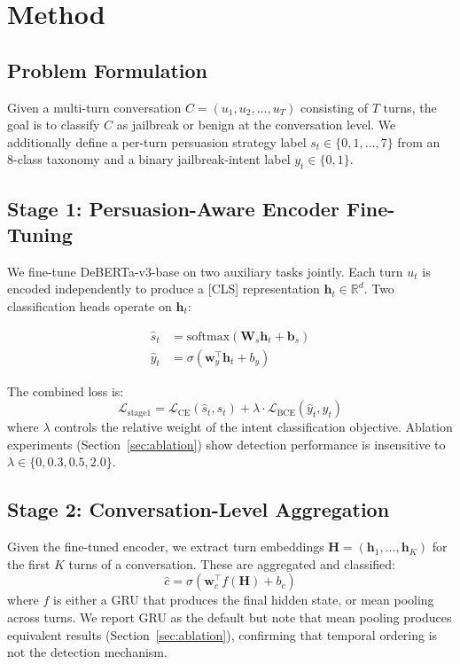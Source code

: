 \documentclass[11pt,a4paper]{article}
\begin{document}
\section{Method}

\subsection{Problem Formulation}
Given a multi-turn conversation $C = (u_1, u_2, \ldots, u_T)$ consisting of $T$ turns, the goal is to classify $C$ as jailbreak or benign at the conversation level.
We additionally define a per-turn persuasion strategy label $s_t \in \{0, 1, \ldots, 7\}$ from an 8-class taxonomy and a binary jailbreak-intent label $y_t \in \{0, 1\}$.

\subsection{Stage 1: Persuasion-Aware Encoder Fine-Tuning}
We fine-tune DeBERTa-v3-base \citep{he2021deberta} on two auxiliary tasks jointly.
Each turn $u_t$ is encoded independently to produce a [CLS] representation $\mathbf{h}_t \in \mathbb{R}^d$.
Two classification heads operate on $\mathbf{h}_t$:

\begin{align}
    \hat{s}_t &= \text{softmax}(\mathbf{W}_s \mathbf{h}_t + \mathbf{b}_s) \label{eq:persuasion} \\
    \hat{y}_t &= \sigma(\mathbf{w}_y^\top \mathbf{h}_t + b_y) \label{eq:intent}
\end{align}

The combined loss is:
\begin{equation}
    \mathcal{L}_{\text{stage1}} = \mathcal{L}_{\text{CE}}(\hat{s}_t, s_t) + \lambda \cdot \mathcal{L}_{\text{BCE}}(\hat{y}_t, y_t)
\end{equation}
where $\lambda$ controls the relative weight of the intent classification objective.
Ablation experiments (Section~\ref{sec:ablation}) show detection performance is insensitive to $\lambda \in \{0, 0.3, 0.5, 2.0\}$.

\subsection{Stage 2: Conversation-Level Aggregation}
Given the fine-tuned encoder, we extract turn embeddings $\mathbf{H} = (\mathbf{h}_1, \ldots, \mathbf{h}_K)$ for the first $K$ turns of a conversation.
These are aggregated and classified:
\begin{equation}
    \hat{c} = \sigma(\mathbf{w}_c^\top f(\mathbf{H}) + b_c)
\end{equation}
where $f$ is either a GRU that produces the final hidden state, or mean pooling across turns.
We report GRU as the default but note that mean pooling produces equivalent results (Section~\ref{sec:ablation}), confirming that temporal ordering is not the detection mechanism.
\end{document}
